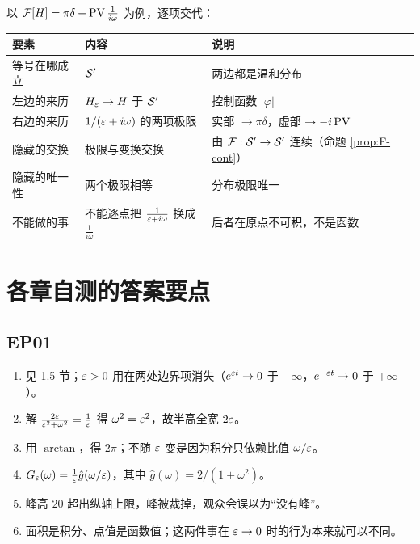 以 $\mathcal{F}[H]=\pi\delta+\operatorname{PV}\frac{1}{i\omega}$ 为例，逐项交代：

\begin{center}
\small
\renewcommand{\arraystretch}{1.45}
\begin{tabularx}{\textwidth}{@{}L{2.4cm}L{3.6cm}Y@{}}
\toprule
要素 & 内容 & 说明 \\
\midrule
等号在哪成立 & $\mathcal{S}'$ & 两边都是温和分布 \\
左边的来历 & $H_\varepsilon\to H$ 于 $\mathcal{S}'$ & 控制函数 $|\varphi|$ \\
右边的来历 & $1/(\varepsilon+i\omega)$ 的两项极限 & 实部 $\to\pi\delta$，虚部 $\to-i\operatorname{PV}$ \\
隐藏的交换 & 极限与变换交换 & 由 $\mathcal{F}:\mathcal{S}'\to\mathcal{S}'$ 连续（命题 \ref{prop:F-cont}）\\
隐藏的唯一性 & 两个极限相等 & 分布极限唯一 \\
不能做的事 & 不能逐点把 $\frac{1}{\varepsilon+i\omega}$ 换成 $\frac{1}{i\omega}$ & 后者在原点不可积，不是函数 \\
\bottomrule
\end{tabularx}
\end{center}

\section{各章自测的答案要点}

\subsection*{EP01}

\begin{enumerate}[leftmargin=1.8em,itemsep=0.3em]
\item 见 1.5 节；$\varepsilon>0$ 用在两处边界项消失（$e^{\varepsilon t}\to0$ 于 $-\infty$，$e^{-\varepsilon t}\to0$ 于 $+\infty$）。
\item 解 $\frac{2\varepsilon}{\varepsilon^{2}+\omega^{2}}=\frac{1}{\varepsilon}$ 得 $\omega^{2}=\varepsilon^{2}$，故半高全宽 $2\varepsilon$。
\item 用 $\arctan$，得 $2\pi$；不随 $\varepsilon$ 变是因为积分只依赖比值 $\omega/\varepsilon$。
\item $G_\varepsilon(\omega)=\frac{1}{\varepsilon}\hat g(\omega/\varepsilon)$，其中 $\hat g(\omega)=2/(1+\omega^{2})$。
\item 峰高 $20$ 超出纵轴上限，峰被裁掉，观众会误以为“没有峰”。
\item 面积是积分、点值是函数值；这两件事在 $\varepsilon\to0$ 时的行为本来就可以不同。
\end{enumerate}

